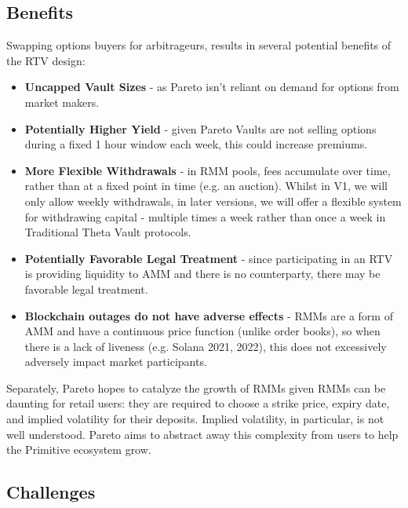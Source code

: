 \documentclass[hidelinks, 12pt]{article}
\begin{document}
\subsection{Benefits}

Swapping options buyers for arbitrageurs, results in several potential benefits of the RTV design:
\begin{itemize}
    \item \textbf{Uncapped Vault Sizes} - as Pareto isn't reliant on demand for options from market makers.
    \item \textbf{Potentially Higher Yield} - given Pareto Vaults are not selling options during a fixed 1 hour window each week, this could increase premiums.    
    \item \textbf{More Flexible Withdrawals} - in RMM pools, fees accumulate over time, rather than at a fixed point in time (e.g. an auction). Whilst in V1, we will only allow weekly withdrawals, in later versions, we will offer a flexible system for withdrawing capital - multiple times a week rather than once a week in Traditional Theta Vault protocols.
    \item \textbf{Potentially Favorable Legal Treatment} - since participating in an RTV is providing liquidity to AMM and there is no counterparty, there may be favorable legal treatment.
    \item \textbf{Blockchain outages do not have adverse effects} - RMMs are a form of AMM and have a continuous price function (unlike order books), so when there is a lack of liveness (e.g. Solana 2021, 2022), this does not excessively adversely impact market participants.
\end{itemize}
Separately, Pareto hopes to catalyze the growth of RMMs given RMMs can be daunting for retail users: they are required to choose a strike price, expiry date, and implied volatility for their deposits. Implied volatility, in particular, is not well understood. Pareto aims to abstract away this complexity from users to help the Primitive ecosystem grow. 

\subsection{Challenges}
\label{Challenges}
\end{document}
